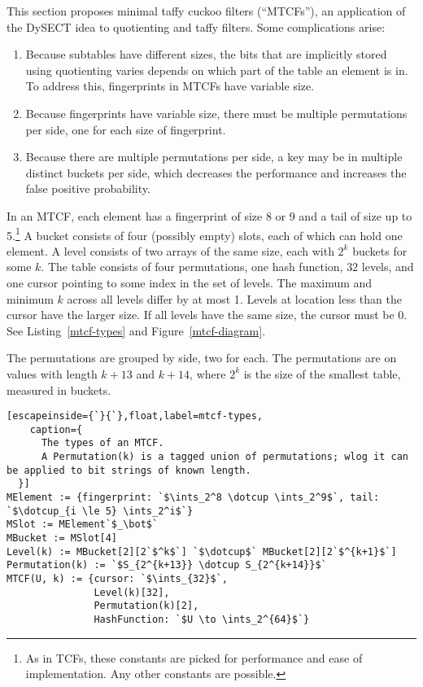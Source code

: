 \documentclass[letterpaper,twocolumn,10pt]{article}
\newcommand{\ints}{\mathbb{Z}}
\newcommand{\dotcup}{\ensuremath{\mathaccent\cdot\cup}}
\begin{document}
This section proposes minimal taffy cuckoo filters (``MTCFs''), an application of the DySECT idea to quotienting and taffy filters.
Some complications arise:

\begin{enumerate}
  \item Because subtables have different sizes, the bits that are implicitly stored using quotienting varies depends on which part of the table an element is in.
    To address this, fingerprints in MTCFs have variable size.
  \item Because fingerprints have variable size, there must be multiple permutations per side, one for each size of fingerprint.
  \item Because there are multiple permutations per side, a key may be in multiple distinct buckets per side, which decreases the performance and increases the false positive probability.
\end{enumerate}

In an MTCF, each element has a fingerprint of size 8 or 9 and a tail of size up to 5.\footnote{As in TCFs, these constants are picked for performance and ease of implementation.
Any other constants are possible.
}
A bucket consists of four (possibly empty) slots, each of which can hold one element.
A level consists of two arrays of the same size, each with $2^k$ buckets for some $k$.
The table consists of four permutations, one hash function, $32$ levels, and one cursor pointing to some index in the set of levels.
The maximum and minimum $k$ across all levels differ by at most 1.
Levels at location less than the cursor have the larger size.
If all levels have the same size, the cursor must be 0.
See Listing~\ref{mtcf-types} and Figure~\ref{mtcf-diagram}.

The permutations are grouped by side, two for each.
The permutations are on values with length $k + 13$ and $k + 14$, where $2^k$ is the size of the smallest table, measured in buckets.

\begin{lstlisting}[escapeinside={`}{`},float,label=mtcf-types,
    caption={
      The types of an MTCF.
      A Permutation(k) is a tagged union of permutations; wlog it can be applied to bit strings of known length.
  }]
MElement := {fingerprint: `$\ints_2^8 \dotcup \ints_2^9$`, tail: `$\dotcup_{i \le 5} \ints_2^i$`}
MSlot := MElement`$_\bot$`
MBucket := MSlot[4]
Level(k) := MBucket[2][2`$^k$`] `$\dotcup$` MBucket[2][2`$^{k+1}$`]
Permutation(k) := `$S_{2^{k+13}} \dotcup S_{2^{k+14}}$`
MTCF(U, k) := {cursor: `$\ints_{32}$`,
               Level(k)[32],
               Permutation(k)[2],
               HashFunction: `$U \to \ints_2^{64}$`}

\end{lstlisting}
\end{document}

